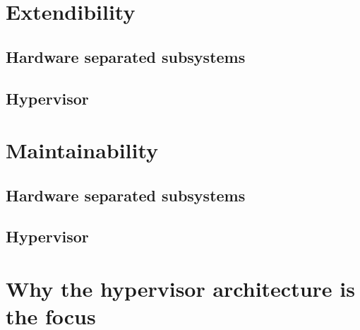 
\section{Extendibility}
\subsection{Hardware separated subsystems}
\subsection{Hypervisor}


\section{Maintainability}
\subsection{Hardware separated subsystems}
\subsection{Hypervisor}


\section{Why the hypervisor architecture is the focus}